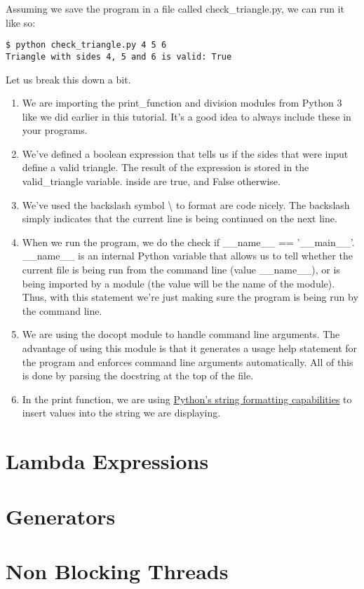 Assuming we save the program in a file called check\_triangle.py, we can
run it like so:

\begin{lstlisting}
$ python check_triangle.py 4 5 6
Triangle with sides 4, 5 and 6 is valid: True
\end{lstlisting}

Let us break this down a bit.

\begin{enumerate}

\item
  We are importing the print\_function and division modules from Python
  3 like we did earlier in this tutorial. It's a good idea to always
  include these in your programs.
\item
  We've defined a boolean expression that tells us if the sides that
  were input define a valid triangle. The result of the expression is
  stored in the valid\_triangle variable. inside are true, and False
  otherwise.
\item
  We've used the backslash symbol \textbackslash{} to format are code
  nicely. The backslash simply indicates that the current line is being
  continued on the next line.
\item
  When we run the program, we do the check if \_\_name\_\_ ==
  '\_\_main\_\_'. \_\_name\_\_ is an internal Python variable that
  allows us to tell whether the current file is being run from the
  command line (value \_\_name\_\_), or is being imported by a module
  (the value will be the name of the module). Thus, with this statement
  we're just making sure the program is being run by the command line.
\item
  We are using the docopt module to handle command line arguments. The
  advantage of using this module is that it generates a usage help
  statement for the program and enforces command line arguments
  automatically. All of this is done by parsing the docstring at the top
  of the file.
\item
  In the print function, we are using
  \href{https://docs.python.org/2/library/string.html\#format-string-syntax}{Python's
  string formatting capabilities} to insert values into the string we
  are displaying.
\end{enumerate}

\section{Lambda Expressions}


\section{Generators}


\section{Non Blocking Threads}


